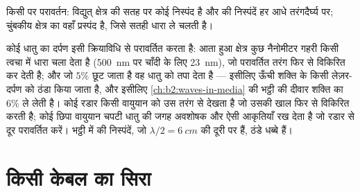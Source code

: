 \begin{omfigure}

{\small किसी  पर परावर्तन: विद्युत् क्षेत्र की सतह पर कोई
निस्पंद है और  की निस्पंदें हर आधे तरंगदैर्घ्य पर;
चुंबकीय क्षेत्र का वहाँ प्रस्पंद है, जिसे सतही धारा
ले चलती है।}
\end{omfigure}

\begin{example}[दर्पण, रडार, सूक्ष्मतरंग भट्ठियाँ]\label{ex:b2:wave-interfaces:conductoruses}
कोई धातु का दर्पण इसी क्रियाविधि से परावर्तित करता है: आता हुआ क्षेत्र
कुछ नैनोमीटर गहरी किसी त्वचा में धारा चला देता है (\qty{500}{nm} पर चाँदी
के लिए \qty{23}{nm}), जो परावर्तित तरंग फिर से विकिरित कर देती है; और जो $5\%$
छूट जाता है वह धातु को तपा देता है --- इसीलिए ऊँची शक्ति के किसी
लेज़र-दर्पण को ठंडा किया जाता है, और इसीलिए
\cref{ch:b2:waves-in-media} की भट्ठी की दीवार शक्ति का $6\%$ ले लेती
है। कोई रडार किसी वायुयान को उस तरंग से देखता है जो उसकी खाल फिर से
विकिरित करती है; कोई छिपा वायुयान चपटी धातु की जगह अवशोषक और ऐसी
आकृतियाँ रख देता है जो रडार से दूर परावर्तित करें। भट्ठी में  की निस्पंदें, जो $\lambda/2 =
\qty{6}{cm}$ की दूरी पर हैं, ठंडे धब्बे हैं।
\end{example}

\section{किसी केबल का सिरा}

